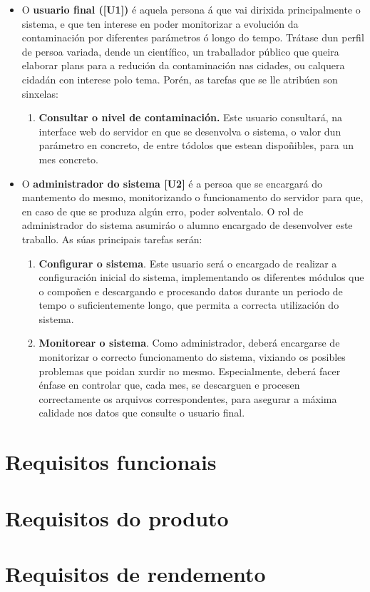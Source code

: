 \begin{itemize}
    \item O \textbf{usuario final ([U1])} é aquela persona á que vai dirixida principalmente o sistema, e que ten interese en poder monitorizar a evolución da contaminación por
    diferentes parámetros ó longo do tempo. Trátase dun perfil de persoa variada, dende un científico, un traballador público que queira elaborar plans para a redución da contaminación
    nas cidades, ou calquera cidadán con interese polo tema. Porén, as tarefas que se lle atribúen son sinxelas:
    \begin{enumerate}
        \item \textbf{Consultar o nivel de contaminación.} Este usuario consultará, na interface web do servidor en que se desenvolva o sistema, o valor dun parámetro en concreto, de entre
        tódolos que estean dispoñibles, para un mes concreto.
    \end{enumerate}
    \item O \textbf{administrador do sistema [U2]} é a persoa que se encargará do mantemento do mesmo, monitorizando o funcionamento do servidor para que, en caso de que se produza algún
    erro, poder solventalo. O rol de administrador do sistema asumiráo o alumno encargado de desenvolver este traballo. As súas principais tarefas serán:
    \begin{enumerate}
        \item \textbf{Configurar o sistema}. Este usuario será o encargado de realizar a configuración inicial do sistema, implementando os diferentes módulos que o compoñen
        e descargando e procesando datos durante un periodo de tempo o suficientemente longo, que permita a correcta utilización do sistema.
        \item \textbf{Monitorear o sistema}. Como administrador, deberá encargarse de monitorizar o correcto funcionamento do sistema, vixiando os posibles problemas que poidan xurdir no
        mesmo. Especialmente, deberá facer énfase en controlar que, cada mes, se descarguen e procesen correctamente os arquivos correspondentes, para asegurar a máxima calidade nos datos
        que consulte o usuario final.
    \end{enumerate}
\end{itemize}


\section{Requisitos funcionais}

\section{Requisitos do produto}

\section{Requisitos de rendemento}